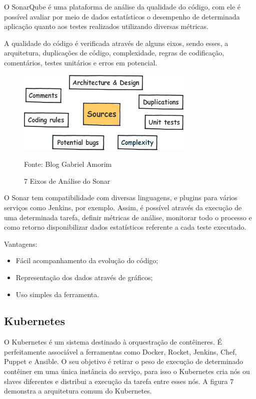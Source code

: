 O SonarQube é uma plataforma de análise da qualidade do código, com ele é possível avaliar por meio de dados estatísticos o desempenho de determinada aplicação quanto aos testes realizados utilizando diversas métricas. 

A qualidade do código é verificada através de alguns eixos, sendo esses, a arquitetura, duplicações de código, complexidade, regras de codificação, comentários, testes unitários e erros em potencial.

\begin{figure}[htb]
	\centering
	\includegraphics[width=0.5\linewidth]{imagens/7axes_sonar}
	\caption{7 Eixos de Análise do Sonar}
	Fonte: Blog Gabriel Amorim\footnotemark
	\label{fig:7axessonar}
\end{figure}

O Sonar tem compatibilidade com diversas linguagens, e plugins para vários serviços como Jenkins, por exemplo. Assim, é possível através da execução de uma determinada tarefa, definir métricas de análise, monitorar todo o processo e como retorno disponibilizar dados estatísticos referente a cada teste executado.

Vantagens:
\begin{itemize}
	\item Fácil acompanhamento da evolução do código;
	\item Representação dos dados através de gráficos;
	\item Uso simples da ferramenta.
\end{itemize}

\subsection{Kubernetes}

O Kubernetes é um sistema destinado à orquestração de contêineres. É perfeitamente associável a ferramentas como Docker, Rocket, Jenkins, Chef, Puppet e Ansible. O seu objetivo é retirar o peso de execução de determinado contêiner em uma única instância do serviço, para isso o Kubernetes cria nós ou slaves diferentes e distribui a execução da tarefa entre esses nós. A figura 7 demonstra a arquitetura comum do Kubernetes.

